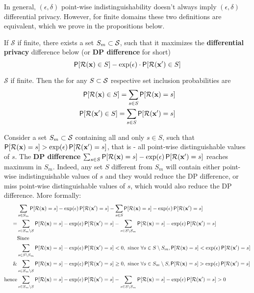 \documentclass[11pt]{article}
\newcommand{\cR}{\mathcal{R}}
\newcommand{\Ssp}{\mathcal{S}}
\newcommand{\xv}{\mathbf{x}}
\begin{document}
In general, $(\epsilon,\delta)$ point-wise indistinguishability doesn't always imply $(\epsilon,\delta)$ differential privacy.  However, for finite domains these two definitions are equivalent, which we prove in the propositions below.

\begin{prop}\label{cr:max} If ${\Ssp}$  if finite, there exists a set $S_m \cont \Ssp$, such that it maximizes the \textbf{differential privacy} difference below (or \textbf{DP difference} for short)
\[ \P[\cR(\xv) \in S]  - \exp(\epsilon) \cdot \P[\cR(\xv') \in S] \]

${\Ssp}$  if finite.  Then the for any $S \cont \Ssp$ respective set inclusion probabilities are
\begin{align*}
\P[\cR(\xv) \in S]  = \sum_{s \in S} \P[\cR(\xv) = s]  \\
 \P[\cR(\xv') \in S]  = \sum_{s \in S} \P[\cR(\xv') = s]  \\
\end{align*}

Consider a set  $S_m \cont \Ssp$ containing all and only $s \in S$, such that $\P[\cR(\xv) = s] >  \exp(\epsilon) \P[\cR(\xv') = s]$, that is - all point-wise distinguishable values of $s$.  The  \textbf{DP difference} $\sum_{s \in S} \P[\cR(\xv) = s] -  \exp(\epsilon)  \P[\cR(\xv') = s] $ reaches maximum in $S_m$. Indeed, any set $S$ different from $S_m$ will contain either point-wise indistinguishable values of $s$ and they would reduce the DP difference, or miss point-wise distinguishable values of $s$, which would also reduce the DP difference.   More formally:
\begin{align*}
& \sum_{s \in S_m} \P[\cR(\xv) = s] -  \exp(\epsilon)  \P[\cR(\xv') = s] - \sum_{s \in S} \P[\cR(\xv) = s] -  \exp(\epsilon)  \P[\cR(\xv') = s] \\
= & \sum_{s \in S_m \setminus S} \P[\cR(\xv) = s] -  \exp(\epsilon)  \P[\cR(\xv') = s]  -  \sum_{s \in S \setminus S_m} \P[\cR(\xv) = s] -  \exp(\epsilon)  \P[\cR(\xv') = s] \\
 & \text{Since} \\
 & \sum_{s \in S \setminus S_m} \P[\cR(\xv) = s] -  \exp(\epsilon)  \P[\cR(\xv') = s]  < 0, \text{ since } \forall s \in S \setminus S_m,   \P[\cR(\xv) = s] < \exp(\epsilon)  \P[\cR(\xv') = s] \\
 \& & \sum_{s \in S_m \setminus S} \P[\cR(\xv) = s] -  \exp(\epsilon)  \P[\cR(\xv') = s]  \ge 0, \text{ since } \forall s \in S_m \setminus S,   \P[\cR(\xv) = s] > \exp(\epsilon)  \P[\cR(\xv') = s] \\
 \text{hence} &  \sum_{s \in S_m \setminus S} \P[\cR(\xv) = s] -  \exp(\epsilon)  \P[\cR(\xv') = s]  -  \sum_{s \in S \setminus S_m} \P[\cR(\xv) = s] -  \exp(\epsilon)  \P[\cR(\xv') = s] > 0
\end{align*}
\end{prop}
\end{document}
